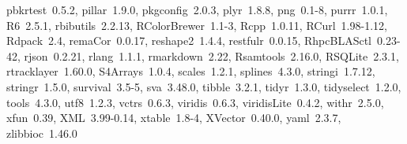 \documentclass[12pt]{article}\usepackage[]{graphicx}\usepackage[]{xcolor}
\begin{document}
\begin{itemize}
    pbkrtest~0.5.2, pillar~1.9.0, pkgconfig~2.0.3, plyr~1.8.8,
    png~0.1-8, purrr~1.0.1, R6~2.5.1, rbibutils~2.2.13,
    RColorBrewer~1.1-3, Rcpp~1.0.11, RCurl~1.98-1.12, Rdpack~2.4,
    remaCor~0.0.17, reshape2~1.4.4, restfulr~0.0.15,
    RhpcBLASctl~0.23-42, rjson~0.2.21, rlang~1.1.1, rmarkdown~2.22,
    Rsamtools~2.16.0, RSQLite~2.3.1, rtracklayer~1.60.0,
    S4Arrays~1.0.4, scales~1.2.1, splines~4.3.0, stringi~1.7.12,
    stringr~1.5.0, survival~3.5-5, sva~3.48.0, tibble~3.2.1,
    tidyr~1.3.0, tidyselect~1.2.0, tools~4.3.0, utf8~1.2.3,
    vctrs~0.6.3, viridis~0.6.3, viridisLite~0.4.2, withr~2.5.0,
    xfun~0.39, XML~3.99-0.14, xtable~1.8-4, XVector~0.40.0, yaml~2.3.7,
    zlibbioc~1.46.0
\end{itemize}






\end{document}
